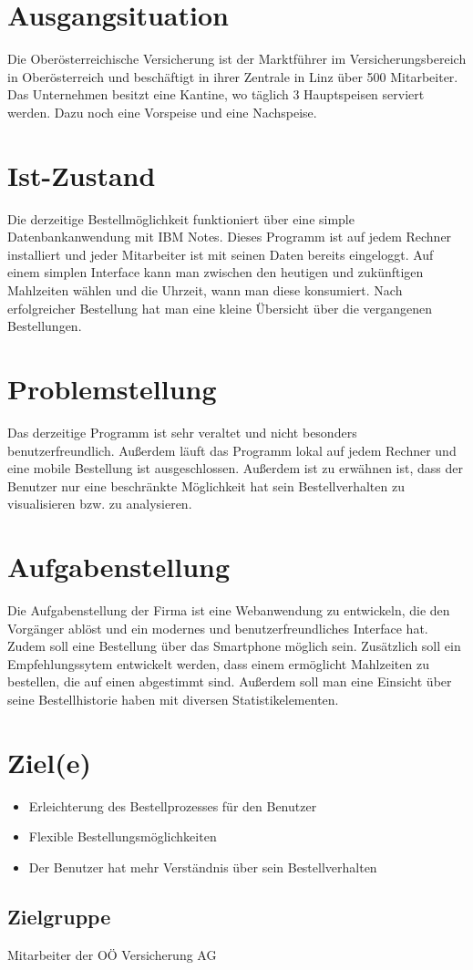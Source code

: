 \section{Ausgangsituation}
\author{Benjamin Besic}
Die Oberösterreichische Versicherung ist der Marktführer im Versicherungsbereich in Oberösterreich 
und beschäftigt in ihrer Zentrale in Linz über 500 Mitarbeiter.
Das Unternehmen besitzt eine Kantine, wo täglich 3 Hauptspeisen serviert werden. Dazu noch
eine Vorspeise und eine Nachspeise. 
\section{Ist-Zustand}
\author{Benjamin Besic}
Die derzeitige Bestellmöglichkeit funktioniert über eine simple Datenbankanwendung mit IBM Notes.
Dieses Programm ist auf jedem Rechner installiert und jeder Mitarbeiter ist mit seinen Daten bereits eingeloggt.
Auf einem simplen Interface kann man zwischen den heutigen und zukünftigen Mahlzeiten wählen und die Uhrzeit, wann man 
diese konsumiert. Nach erfolgreicher Bestellung hat man eine kleine Übersicht über die vergangenen Bestellungen.
\section{Problemstellung}
\author{Benjamin Besic}
Das derzeitige Programm ist sehr veraltet und nicht besonders benutzerfreundlich. Außerdem
läuft das Programm lokal auf jedem Rechner und eine mobile Bestellung ist ausgeschlossen.
Außerdem ist zu erwähnen ist, dass der Benutzer nur eine beschränkte Möglichkeit hat sein Bestellverhalten 
zu visualisieren bzw. zu analysieren.
\section{Aufgabenstellung}
\author{Benjamin Besic}
Die Aufgabenstellung der Firma ist eine Webanwendung zu entwickeln, die den Vorgänger ablöst
und ein modernes und benutzerfreundliches Interface hat. Zudem soll eine Bestellung über das Smartphone
möglich sein. Zusätzlich soll ein Empfehlungssytem entwickelt werden, dass einem ermöglicht Mahlzeiten zu 
bestellen, die auf einen abgestimmt sind. Außerdem soll man eine Einsicht über seine Bestellhistorie haben
mit diversen Statistikelementen.
\section{Ziel(e)}
\author{Benjamin Besic}
\begin{itemize}
    \item Erleichterung des Bestellprozesses für den Benutzer
    \item Flexible Bestellungsmöglichkeiten
    \item Der Benutzer hat mehr Verständnis über sein Bestellverhalten
\end{itemize}

\subsection{Zielgruppe}
Mitarbeiter der OÖ Versicherung AG
